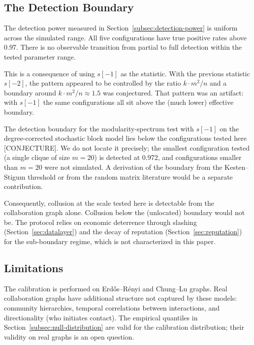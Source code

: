 \documentclass[11pt,a4paper]{article}
\numberwithin{equation}{section}
\numberwithin{table}{section}
\begin{document}
\subsection{The Detection Boundary}
The detection power measured in Section~\ref{subsec:detection-power} is uniform across the simulated range. All five configurations have true positive rates above 0.97. There is no observable transition from partial to full detection within the tested parameter range.

This is a consequence of using $s[-1]$ as the statistic. With the previous statistic $s[-2]$, the pattern appeared to be controlled by the ratio $k \cdot m^2 / n$ and a boundary around $k \cdot m^2 / n \approx 1.5$ was conjectured. That pattern was an artifact: with $s[-1]$ the same configurations all sit above the (much lower) effective boundary.

The detection boundary for the modularity-spectrum test with $s[-1]$ on the degree-corrected stochastic block model lies below the configurations tested here [CONJECTURE]. We do not locate it precisely; the smallest configuration tested (a single clique of size $m=20$) is detected at 0.972, and configurations smaller than $m=20$ were not simulated. A derivation of the boundary from the Kesten--Stigum threshold or from the random matrix literature would be a separate contribution.

Consequently, collusion at the scale tested here is detectable from the collaboration graph alone. Collusion below the (unlocated) boundary would not be. The protocol relies on economic deterrence through slashing (Section~\ref{sec:datalayer}) and the decay of reputation (Section~\ref{sec:reputation}) for the sub-boundary regime, which is not characterized in this paper.

\subsection{Limitations}
The calibration is performed on Erd\H{o}s--R\'enyi and Chung--Lu graphs. Real collaboration graphs have additional structure not captured by these models: community hierarchies, temporal correlations between interactions, and directionality (who initiates contact). The empirical quantiles in Section~\ref{subsec:null-distribution} are valid for the calibration distribution; their validity on real graphs is an open question.
\end{document}
